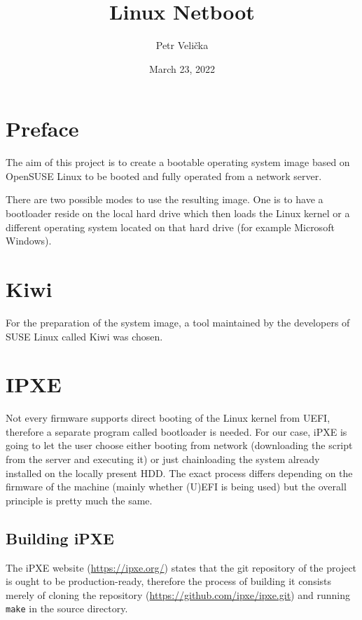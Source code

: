 \documentclass{article}
\title{Linux Netboot}
\date{March 23, 2022}
\author{Petr Velička}
\begin{document}
\maketitle

\section{Preface}

The aim of this project is to create a bootable operating system image based on OpenSUSE Linux to be booted and fully operated from a network server.

There are two possible modes to use the resulting image. One is to have a bootloader reside on the local hard drive which then loads the Linux kernel or a different operating system located on that hard drive (for example Microsoft Windows).

\section{Kiwi}

For the preparation of the system image, a tool maintained by the developers of SUSE Linux called Kiwi was chosen.


\section{IPXE}

Not every firmware supports direct booting of the Linux kernel from UEFI, therefore a separate program called bootloader is needed. For our case, iPXE is going to let the user choose either booting from network (downloading the script from the server and executing it) or just chainloading the system already installed on the locally present HDD. The exact process differs depending on the firmware of the machine (mainly whether (U)EFI is being used) but the overall principle is pretty much the same.

\subsection{Building iPXE}

The iPXE website (\url{https://ipxe.org/}) states that the git repository of the project is ought to be production-ready,
therefore the process of building it consists merely of cloning the repository (\url{https://github.com/ipxe/ipxe.git}) and running \verb|make| in the source directory.
\end{document}
